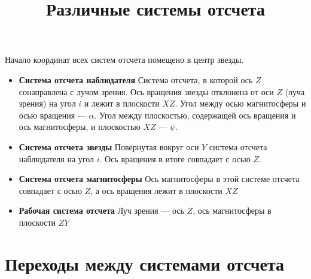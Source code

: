 \documentclass[12pt]{article}
\begin{document}
\title{Различные системы отсчета}
\maketitle

Начало координат всех систем отсчета помещено в центр звезды.

\begin{itemize}
\item \textbf{Система отсчета наблюдателя}
Система отсчета, в которой ось $Z$ сонаправлена с лучом зрения. Ось вращения звезды отклонена от оси $Z$ (луча зрения) на угол $i$ и лежит в плоскости $XZ$. Угол между осью магнитосферы и осью вращения --- $\alpha$. Угол между плоскостью, содержащей ось вращения и ось магнитосферы, и плоскостью $XZ$ --- $\psi$.
\item \textbf{Система отсчета звезды}
Повернутая вокруг оси $Y$ система отсчета наблюдателя на угол $i$. Ось вращения в итоге совпадает с осью $Z$. 
\item \textbf{Система отсчета магнитосферы}
Ось магнитосферы в этой системе отсчета совпадает с осью $Z$, а ось вращения лежит в плоскости $XZ$ 
\item \textbf{Рабочая система отсчета}
Луч зрения --- ось $Z$, ось магнитосферы в плоскости $ZY$
\end{itemize}

\section{Переходы между системами отсчета}
\end{document}
